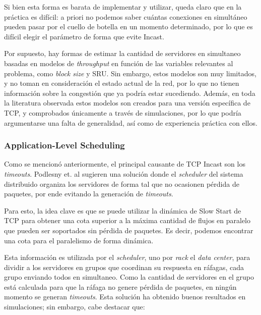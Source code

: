 \documentclass[runningheads,a4paper]{llncs}
\begin{document}
Si bien esta forma es barata de implementar y utilizar, queda claro que en la práctica es difícil: a priori no podemos saber cuántas conexiones en simultáneo pueden pasar por el cuello de botella en un momento determinado, por lo que es difícil elegir el parámetro de forma que evite Incast.

Por supuesto, hay formas de estimar la cantidad de servidores en simultaneo \cite{Zheng_BlockSizeExp_2011} \cite{Chen_BlockSizeExpV2_2012} basadas en modelos de \textit{throughput} en función de las variables relevantes al problema, como \textit{block size} y SRU. Sin embargo, estos modelos son muy limitados, y no toman en consideración el estado actual de la red, por lo que no tienen información sobre la congestión que ya podría estar sucediendo. Además, en toda la literatura observada estos modelos son creados para una versión específica de TCP, y comprobados únicamente a través de simulaciones, por lo que podría argumentarse una falta de generalidad, así como de experiencia práctica con ellos.

\subsubsection{Application-Level Scheduling}

Como se mencionó anteriormente, el principal causante de TCP Incast son los \textit{timeouts}. Podlesny et. al \cite{Podlesny_ApplicationLevelScheduling_2012} sugieren una solución donde el \textit{scheduler} del sistema distribuido organiza los servidores de forma tal que no ocasionen pérdida de paquetes, por ende evitando la generación de \textit{timeouts}.

Para esto, la idea clave es que se puede utilizar la dinámica de Slow Start de TCP para obtener una cota superior a la máxima cantidad de flujos en paralelo que pueden ser soportados sin pérdida de paquetes. Es decir, podemos encontrar una cota para el paralelismo de forma dinámica.

Esta información es utilizada por el \textit{scheduler}, uno por \textit{rack} el \textit{data center}, para dividir a los servidores en grupos que coordinan su respuesta en ráfagas, cada grupo enviando todos en simultaneo. Como la cantidad de servidores en el grupo está calculada para que la ráfaga no genere pérdida de paquetes, en ningún momento se generan \textit{timeouts}. Esta solución ha obtenido buenos resultados en simulaciones; sin embargo, cabe destacar que:
\end{document}
